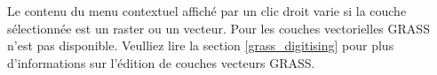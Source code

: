 Le contenu du menu contextuel affiché par un clic droit varie si la couche sélectionnée est un raster ou un vecteur. Pour les couches vectorielles GRASS  n'est pas disponible. Veulliez lire la section \ref{grass_digitising} pour plus d'informations sur l'édition de couches vecteurs GRASS.

%

